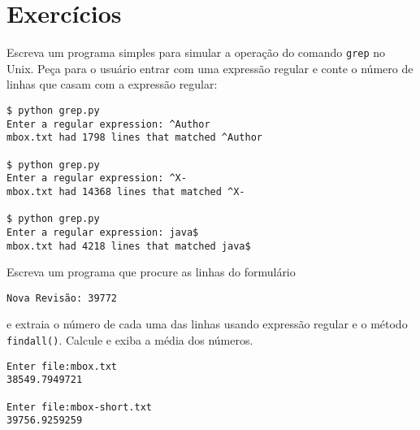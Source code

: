 \section{Exercícios}

\begin{ex}
Escreva um programa simples para simular a operação do comando {\tt grep} 
no Unix. Peça para o usuário entrar com uma expressão regular e conte o 
número de linhas que casam com a expressão regular:

\beforeverb
\begin{verbatim}
$ python grep.py
Enter a regular expression: ^Author
mbox.txt had 1798 lines that matched ^Author

$ python grep.py
Enter a regular expression: ^X-
mbox.txt had 14368 lines that matched ^X-

$ python grep.py
Enter a regular expression: java$
mbox.txt had 4218 lines that matched java$
\end{verbatim}
\afterverb
%
\end{ex}

\begin{ex}
Escreva um programa que procure as linhas do formulário

\verb"Nova Revisão: 39772"

e extraia o número de cada uma das linhas usando expressão regular e o 
método {\tt findall()}. Calcule e exiba a média dos números.

\beforeverb
\begin{verbatim}
Enter file:mbox.txt 
38549.7949721

Enter file:mbox-short.txt
39756.9259259
\end{verbatim}
\afterverb
%

\end{ex}
